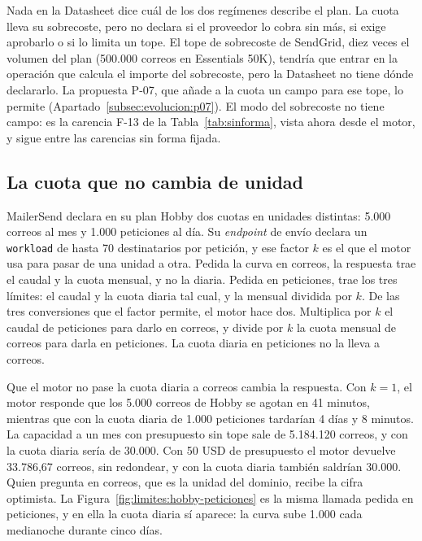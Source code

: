 Nada en la Datasheet dice cuál de los dos regímenes describe el plan.
La cuota lleva su sobrecoste, pero no declara si el proveedor lo cobra sin más, si exige aprobarlo o si lo limita un tope.
El tope de sobrecoste de SendGrid, diez veces el volumen del plan (500.000 correos en Essentials 50K), tendría que entrar en la operación que calcula el importe del sobrecoste, pero la Datasheet no tiene dónde declararlo.
La propuesta P-07, que añade a la cuota un campo para ese tope, lo permite (Apartado~\ref{subsec:evolucion:p07}).
El modo del sobrecoste no tiene campo: es la carencia F-13 de la Tabla~\ref{tab:sinforma}, vista ahora desde el motor, y sigue entre las carencias sin forma fijada.

\subsection{La cuota que no cambia de unidad}
\label{subsec:evolucion:h1}

MailerSend declara en su plan Hobby dos cuotas en unidades distintas: 5.000 correos al mes y 1.000 peticiones al día.
Su \textit{endpoint} de envío declara un \texttt{workload} de hasta 70 destinatarios por petición, y ese factor $k$ es el que el motor usa para pasar de una unidad a otra.
Pedida la curva en correos, la respuesta trae el caudal y la cuota mensual, y no la diaria.
Pedida en peticiones, trae los tres límites: el caudal y la cuota diaria tal cual, y la mensual dividida por $k$.
De las tres conversiones que el factor permite, el motor hace dos.
Multiplica por $k$ el caudal de peticiones para darlo en correos, y divide por $k$ la cuota mensual de correos para darla en peticiones.
La cuota diaria en peticiones no la lleva a correos.

Que el motor no pase la cuota diaria a correos cambia la respuesta.
Con $k = 1$, el motor responde que los 5.000 correos de Hobby se agotan en 41 minutos, mientras que con la cuota diaria de 1.000 peticiones tardarían 4 días y 8 minutos.
La capacidad a un mes con presupuesto sin tope sale de 5.184.120 correos, y con la cuota diaria sería de 30.000.
Con 50 USD de presupuesto el motor devuelve 33.786,67 correos, sin redondear, y con la cuota diaria también saldrían 30.000.
Quien pregunta en correos, que es la unidad del dominio, recibe la cifra optimista.
La Figura~\ref{fig:limites:hobby-peticiones} es la misma llamada pedida en peticiones, y en ella la cuota diaria sí aparece: la curva sube 1.000 cada medianoche durante cinco días.

